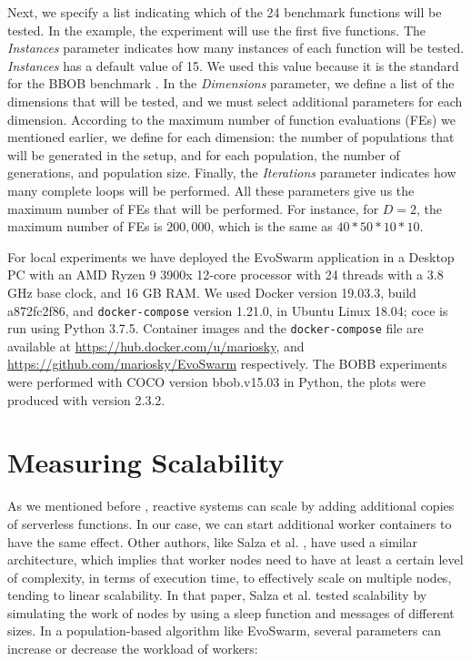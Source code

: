 \documentclass[review]{elsarticle}
\begin{document}
Next, we specify a list indicating which of the 24 benchmark
functions will be tested. In the example, the experiment will use the first five
functions.  The {\em Instances} parameter indicates how many instances of each
function will be tested. {\em Instances}  has a default value of 15. We used this
value because it is the standard for the BBOB benchmark \cite{hansen2016coco}.
In the {\em Dimensions} parameter, we define a list of the dimensions that will
be tested, and we must select additional parameters for each dimension.
According to the maximum number of function evaluations (FEs) we mentioned
earlier, we define for each dimension: the number of populations that will be
generated in the setup, and for each population,  the number of generations, and
population size. Finally, the {\em Iterations} parameter indicates how many
complete loops will be performed. All these parameters give us the maximum
number of FEs that will be performed. For instance, for $D = 2$, the maximum
number of FEs is $200,000$, which is the same as $40*50*10*10$.

For local experiments we have deployed the EvoSwarm application in a
Desktop PC with an AMD Ryzen 9 3900x 12-core processor with 24 threads with a 3.8 GHz base clock, 
and 16 GB RAM. We used Docker version 19.03.3, build a872fc2f86, and {\tt docker-compose} version 1.21.0, 
in Ubuntu Linux 18.04; coce is run using Python 3.7.5. Container images and the {\tt docker-compose} file are available at
\url{https://hub.docker.com/u/mariosky}, and \url{https://github.com/mariosky/EvoSwarm} respectively. 
The BOBB experiments were performed with COCO \cite{hansen2016coco} version bbob.v15.03 in Python, 
the plots were produced with version 2.3.2. %

\section{Measuring Scalability}
\label{sec:exp1}
As we mentioned before %
, reactive systems can scale by adding additional copies
of serverless functions. In our case, we can start additional worker containers
to have the same effect. Other authors, like Salza et al. \cite{salza2019speed},
have used a
similar architecture, which implies that worker nodes need to have at least a certain level
of complexity, in terms of execution time,  to effectively scale on multiple
nodes, tending to linear scalability. In that paper, Salza et al. tested scalability
by simulating the work of nodes by using a sleep function and messages of different sizes.
In a population-based algorithm like EvoSwarm, several parameters can increase or 
decrease the workload of workers:
\end{document}
